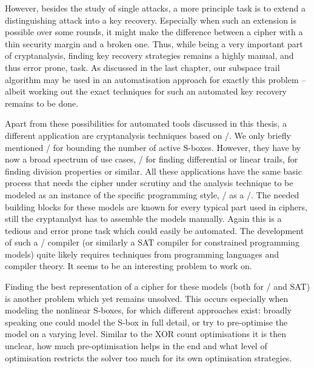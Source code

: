 However, besides the study of single attacks, a more principle task is to extend a distinguishing attack into a key recovery.
Especially when such an extension is possible over some rounds, it might make the difference between a cipher with a thin security margin and a broken one.
Thus, while being a very important part of cryptanalysis, finding key recovery strategies remains a highly manual, and thus error prone, task.
As discussed in the last chapter, our subspace trail algorithm may be used in an automatisation approach for exactly this problem -- albeit working out the exact techniques for such an automated key recovery remains to be done.

Apart from these possibilities for automated tools discussed in this thesis, a different application are cryptanalysis techniques based on \MILPp/.
We only briefly mentioned \MILPp/ for bounding the number of active S-boxes.
However, they have by now a broad spectrum of use cases, \eg/ for finding differential or linear trails, for finding division properties or similar.
All these applications have the same basic process that needs the cipher under scrutiny and the analysis technique to be modeled as an instance of the specific programming style, \ie/ as a \MILP/.
The needed building blocks for these models are known for every typical part used in ciphers, still the cryptanalyst has to assemble the models manually.
Again this is a tedious and error prone task which could easily be automated.
The development of such a \MILP/ compiler (or similarly a SAT compiler for constrained programming models) quite likely requires techniques from programming languages and compiler theory.
It seems to be an interesting problem to work on.

Finding the best representation of a cipher for these models (both for \MILPp/ and SAT) is another problem which yet remains unsolved.
This occurs especially when modeling the nonlinear S-boxes, for which different approaches exist: broadly speaking one could model the S-box in full detail, or try to pre-optimise the model on a varying level.
Similar to the XOR count optimisations it is then unclear, how much pre-optimisation helps in the end and what level of optimisation restricts the solver too much for its own optimisation strategies.
